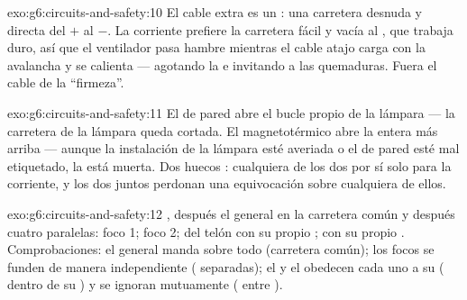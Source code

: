 \begin{solution}{exo:g6:circuits-and-safety:10}
El cable extra es un : una carretera desnuda y directa
del $+$ al $-$. La corriente prefiere la carretera fácil y vacía al
, que trabaja duro, así que el ventilador pasa hambre
mientras el cable atajo carga con la avalancha y se calienta ---
agotando la  e invitando a las quemaduras. Fuera el cable de la
``firmeza''.
\end{solution}

\begin{solution}{exo:g6:circuits-and-safety:11}
El  de pared abre el bucle propio de la lámpara --- la
carretera de la lámpara queda cortada. El magnetotérmico abre la
 entera más arriba --- aunque la instalación de la lámpara
esté averiada o el  de pared esté mal etiquetado, la
 está muerta. Dos huecos : cualquiera de los dos
por sí solo para la corriente, y los dos juntos perdonan una
equivocación sobre cualquiera de ellos.
\end{solution}

\begin{solution}{exo:g6:circuits-and-safety:12}
, después el  general en la carretera común y
después cuatro  paralelas: foco 1; foco 2;  del
telón con su propio  ;  con su
propio  . Comprobaciones: el general manda sobre
todo (carretera común); los focos se funden de manera independiente
( separadas); el  y el  obedecen cada
uno a su  ( dentro de su ) y se ignoran
mutuamente ( entre ).
\end{solution}

